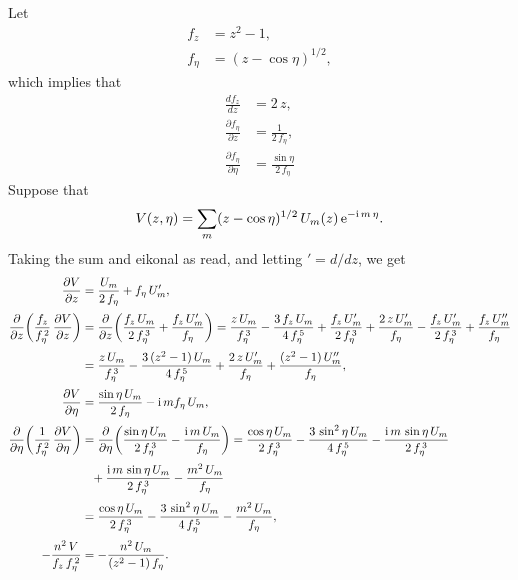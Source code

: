 \documentclass[12pt,prb,aps,notitlepage]{revtex4-1}
\begin{document}
Let
\begin{align}
f_z &= z^2-1,\\[0.5ex]
f_\eta &= (z-\cos\eta)^{1/2},
\end{align}
which implies that
\begin{align}
\frac{df_z}{dz} &= 2\,z,\\[0.5ex]
\frac{\partial f_\eta}{\partial z}&= \frac{1}{2\,f_\eta},\\[0.5ex]
\frac{\partial f_\eta}{\partial\eta} &= \frac{\sin\eta}{2\,f_\eta}
\end{align}
Suppose that
\begin{equation}\label{e13}
V(z,\eta)= \sum_m (z-\cos\eta)^{1/2}\,U_m(z)\,{\rm e}^{-{\rm i}\,m\,\eta}.
\end{equation}
Taking the sum and eikonal as read, and letting $'=d/dz$, we get 
\begin{align}
\frac{\partial V}{\partial z} &=\frac{U_m}{2\,f_\eta} + f_\eta\,U_m',\\[0.5ex]
\frac{\partial}{\partial z}\!\left(\frac{f_z}{f_\eta^{\,2}}\,\frac{\partial V}{\partial z}\right)&=
\frac{\partial}{\partial z}\!\left(\frac{f_z\,U_m}{2\,f_\eta^{\,3}}+ \frac{f_z\,U_m'}{f_\eta}\right)
= \frac{z\,U_m}{f_\eta^{\,3}} -\frac{3\,f_z\,U_m}{4\,f_\eta^{\,5}}+\frac{f_z\,U_m'}{2\,f_\eta^{\,3}}
+\frac{2\,z\,U_m'}{f_\eta}- \frac{f_z\,U_m'}{2\,f_\eta^{\,3}}
+\frac{f_z\,U_m''}{f_\eta}\nonumber\\[0.5ex]
&=\frac{z\,U_m}{f_\eta^{\,3}} -\frac{3\,(z^2-1)\,U_m}{4\,f_\eta^{\,5}}
+\frac{2\,z\,U_m'}{f_\eta}
+\frac{(z^2-1)\,U_m''}{f_\eta},\\[0.5ex]
\frac{\partial V}{\partial \eta} &=\frac{\sin\eta\,U_m}{2\,f_\eta} -{\rm i}\,m f_\eta\,U_m,\\[0.5ex]
\frac{\partial}{\partial \eta}\!\left(\frac{1}{f_\eta^{\,2}}\,\frac{\partial V}{\partial \eta}\right)&=
\frac{\partial}{\partial \eta}\!\left(\frac{\sin\eta\,U_m}{2\,f_\eta^{\,3}}-\frac{{\rm i}\,m\,U_m}{f_\eta}\right)=
\frac{\cos\eta\,U_m}{2\,f_\eta^{\,3}}- \frac{3\,\sin^2\eta\,U_m}{4\,f_\eta^{\,5}}-\frac{{\rm i}\,m\,\sin\eta\,U_m}{2\,f_\eta^{\,3}}\nonumber\\[0.5ex]
&\phantom{=} + \frac{{\rm i}\,m\,\sin\eta\,U_m}{2\,f_\eta^{\,3}} - \frac{m^2\,U_m}{f_\eta}\nonumber\\[0.5ex]
&=\frac{\cos\eta\,U_m}{2\,f_\eta^{\,3}}- \frac{3\,\sin^2\eta\,U_m}{4\,f_\eta^{\,5}} - \frac{m^2\,U_m}{f_\eta},\\[0.5ex]
-\frac{n^2\,V}{f_z\,f_\eta^{\,2}}&= -\frac{n^2\,U_m}{(z^2-1)\,f_\eta}.
\end{align}
\end{document}
